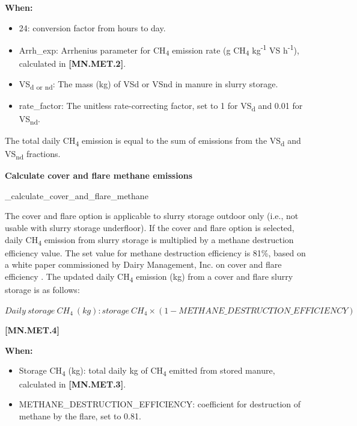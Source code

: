 \begin{refsection}
    \textbf{When:}
    \begin{itemize}
        \item 24: conversion factor from hours to day. 
        \item Arrh\_exp: Arrhenius parameter for CH\textsubscript{4} emission rate (g CH\textsubscript{4} kg\textsuperscript{-1} VS h\textsuperscript{-1}), calculated in \textbf{[MN.MET.2]}. 
        \item VS\textsubscript{d or nd}: The mass (kg) of VSd or VSnd in manure in slurry storage.
        \item rate\_factor: The unitless rate-correcting factor, set to 1 for VS\textsubscript{d} and 0.01 for VS\textsubscript{nd}. 
    \end{itemize}
    \vspace{0.5cm}
    
The total daily CH\textsubscript{4} emission is equal to the sum of emissions from the VS\textsubscript{d} and VS\textsubscript{nd} fractions.
\vspace{0.2cm}

\textbf{Calculate cover and flare methane emissions}
\vspace{0.15cm}

\_calculate\_cover\_and\_flare\_methane
\vspace{0.15cm}

The cover and flare option is applicable to slurry storage outdoor only (i.e., not usable with slurry storage underfloor). If the cover and flare option is selected, daily CH\textsubscript{4} emission from slurry storage is multiplied by a methane destruction efficiency value. The set value for methane destruction efficiency is 81\%, based on a white paper commissioned by Dairy Management, Inc. on cover and flare efficiency \parencite{wallaceDMI}. The updated daily CH\textsubscript{4} emission (kg) from a cover and flare slurry storage is as follows:
\vspace{0.5cm}

    \begin{center}
\(Daily\ storage\ CH_4\ (kg) : storage\ CH_{4} \times (1 - METHANE\_DESTRUCTION\_EFFICIENCY)\)
    \end{center}
        \vspace{0.5cm} 
    
            {\raggedleft \textbf{[MN.MET.4]}\par}
            \vspace{0.5cm}

    \textbf{When:}
    \begin{itemize}
        \item Storage CH\textsubscript{4} (kg): total daily kg of CH\textsubscript{4} emitted from stored manure, calculated in \textbf{[MN.MET.3]}.
        \item METHANE\_DESTRUCTION\_EFFICIENCY: coefficient for destruction of methane by the flare, set to 0.81.


\end{itemize}
\end{refsection}
